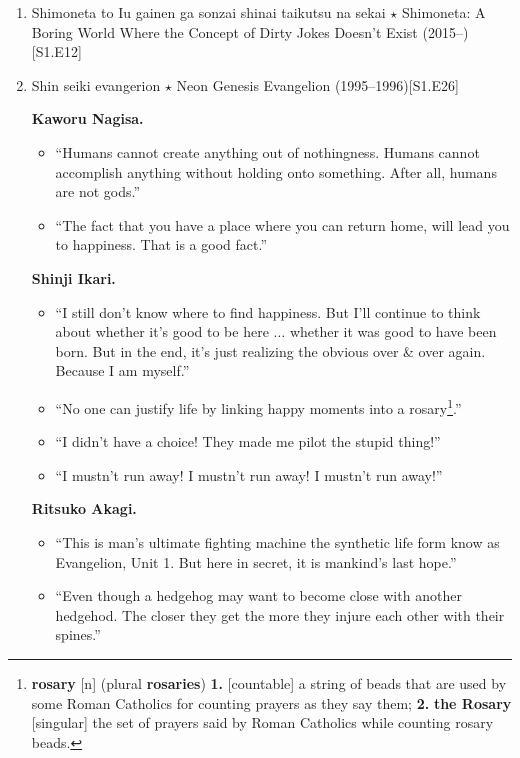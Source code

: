 \documentclass{article}
\begin{document}
\begin{enumerate}
\begin{itemize}
    \end{itemize}
    {\sc Emi Igawa.}
    \begin{itemize}
    	\item``The music felt like April.''
    \end{itemize}
    \item {\sc Shimoneta to Iu gainen ga sonzai shinai taikutsu na sekai $\star$ Shimoneta: A Boring World Where the Concept of Dirty Jokes Doesn't Exist} (2015--)\hfill[S1.E12]
    \item {\sc Shin seiki evangerion $\star$ Neon Genesis Evangelion} (1995--1996)\hfill[S1.E26]
    
    {\bf Kaworu Nagisa.}
	\begin{itemize}
   		\item ``Humans cannot create anything out of nothingness. Humans cannot accomplish anything without holding onto something. After all, humans are not gods.''
   		\item ``The fact that you have a place where you can return home, will lead you to happiness. That is a good fact.''
   	\end{itemize}
    {\bf Shinji Ikari.}
    \begin{itemize}
    	\item ``I still don't know where to find happiness. But I'll continue to think about whether it's good to be here $\ldots$ whether it was good to have been born. But in the end, it's just realizing the obvious over \& over again. Because I am myself.''
    	\item ``No one can justify life by linking happy moments into a rosary\footnote{{\bf rosary} [n] (plural {\bf rosaries}) {\bf 1.} [countable] a string of beads that are used by some Roman Catholics for counting prayers as they say them; {\bf 2.} {\bf the Rosary} [singular] the set of prayers said by Roman Catholics while counting rosary beads.}.''
    	\item ``I didn't have a choice! They made me pilot the stupid thing!''
    	\item ``I mustn't run away! I mustn't run away! I mustn't run away!''
    \end{itemize}
	{\bf Ritsuko Akagi.}
	\begin{itemize}
		\item ``This is man's ultimate fighting machine the synthetic life form know as Evangelion, Unit 1. But here in secret, it is mankind's last hope.''
		\item ``Even though a hedgehog may want to become close with another hedgehod. The closer they get the more they injure each other with their spines.''

\end{itemize}
\end{enumerate}
\end{document}
